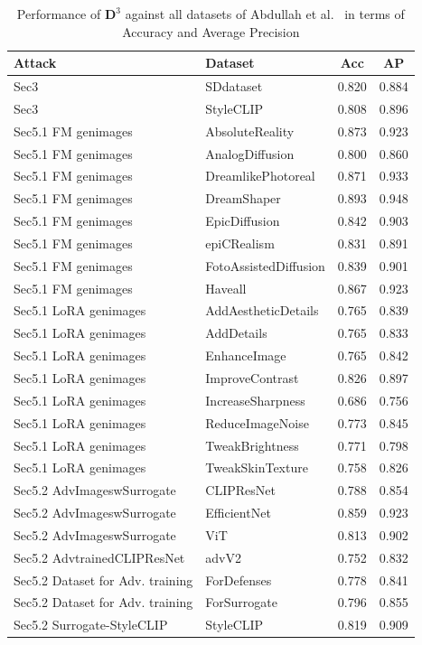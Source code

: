 \documentclass[letterpaper,twocolumn,10pt]{article}
\newcommand{\bm}[1]{\mathbf{#1}} %
\begin{document}
\begin{table}[!htb]
\footnotesize
\setlength{\tabcolsep}{3.5pt} %
\smallskip
\centering
\begin{tabularx}{0.47\textwidth}{llcc}
\toprule[1pt]
Attack & Dataset & Acc & AP \\
\midrule[.8pt]
Sec3 & SDdataset & 0.820 & 0.884  \\
Sec3 & StyleCLIP & 0.808 & 0.896  \\
Sec5.1 FM genimages & AbsoluteReality & 0.873 & 0.923  \\
Sec5.1 FM genimages & AnalogDiffusion & 0.800 & 0.860  \\
Sec5.1 FM genimages & DreamlikePhotoreal & 0.871 & 0.933  \\
Sec5.1 FM genimages & DreamShaper & 0.893 & 0.948  \\
Sec5.1 FM genimages & EpicDiffusion & 0.842 & 0.903  \\
Sec5.1 FM genimages & epiCRealism & 0.831 & 0.891  \\
Sec5.1 FM genimages & FotoAssistedDiffusion & 0.839 & 0.901  \\
Sec5.1 FM genimages & Haveall & 0.867 & 0.923  \\
Sec5.1 LoRA genimages & AddAestheticDetails & 0.765 & 0.839  \\
Sec5.1 LoRA genimages & AddDetails & 0.765 & 0.833  \\
Sec5.1 LoRA genimages & EnhanceImage & 0.765 & 0.842  \\
Sec5.1 LoRA genimages & ImproveContrast & 0.826 & 0.897 \\
Sec5.1 LoRA genimages & IncreaseSharpness & 0.686 & 0.756  \\
Sec5.1 LoRA genimages & ReduceImageNoise & 0.773 & 0.845  \\
Sec5.1 LoRA genimages & TweakBrightness & 0.771 & 0.798  \\
Sec5.1 LoRA genimages & TweakSkinTexture & 0.758 & 0.826  \\
Sec5.2 AdvImageswSurrogate & CLIPResNet & 0.788 & 0.854  \\
Sec5.2 AdvImageswSurrogate & EfficientNet & 0.859 & 0.923  \\
Sec5.2 AdvImageswSurrogate & ViT & 0.813 & 0.902  \\
Sec5.2 AdvtrainedCLIPResNet & advV2 & 0.752 & 0.832 \\
Sec5.2 Dataset for Adv. training & ForDefenses & 0.778 & 0.841 \\
Sec5.2 Dataset for Adv. training & ForSurrogate & 0.796 & 0.855 \\
Sec5.2 Surrogate-StyleCLIP & StyleCLIP & 0.819 & 0.909 \\
\bottomrule[1pt]
\end{tabularx}
\caption{Performance of $\bm{D}^3$ against all datasets of Abdullah et al.~\cite{Sifat2024evolvingthreat} in terms of  Accuracy and Average Precision}
\label{Tab:D3Detector}
\end{table}
\end{document}
